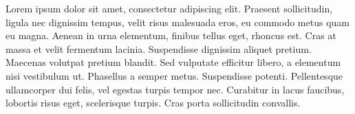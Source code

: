 %
%
%

\begin{agradecimentos}

Lorem ipsum dolor sit amet, consectetur adipiscing elit. Praesent sollicitudin,
ligula nec dignissim tempus, velit risus malesuada eros, eu commodo metus quam
eu magna. Aenean in urna elementum, finibus tellus eget, rhoncus est. Cras at
massa et velit fermentum lacinia. Suspendisse dignissim aliquet pretium.
Maecenas volutpat pretium blandit. Sed vulputate efficitur libero, a elementum
nisi vestibulum ut. Phasellus a semper metus. Suspendisse potenti. Pellentesque
ullamcorper dui felis, vel egestas turpis tempor nec. Curabitur in lacus
faucibus, lobortis risus eget, scelerisque turpis. Cras porta sollicitudin
convallis.

\end{agradecimentos}

